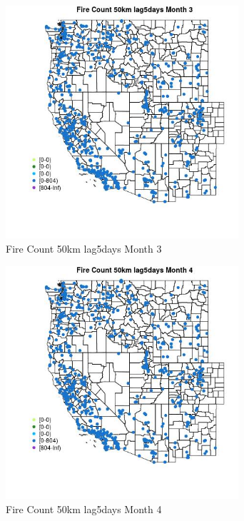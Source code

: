 \begin{figure} 
\centering  
\includegraphics[width=0.77\textwidth]{Code_Outputs/Report_ML_input_PM25_Step4_part_f_de_duplicated_aveswNAs_MapObsMo3Fire_Count_50km_lag5days.jpg} 
\caption{\label{fig:Report_ML_input_PM25_Step4_part_f_de_duplicated_aveswNAsMapObsMo3Fire_Count_50km_lag5days}Fire Count 50km lag5days Month 3} 
\end{figure} 
 

\begin{figure} 
\centering  
\includegraphics[width=0.77\textwidth]{Code_Outputs/Report_ML_input_PM25_Step4_part_f_de_duplicated_aveswNAs_MapObsMo4Fire_Count_50km_lag5days.jpg} 
\caption{\label{fig:Report_ML_input_PM25_Step4_part_f_de_duplicated_aveswNAsMapObsMo4Fire_Count_50km_lag5days}Fire Count 50km lag5days Month 4} 
\end{figure} 
 


